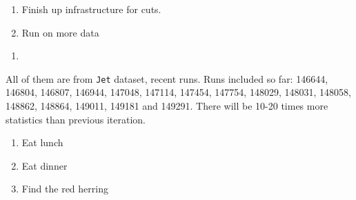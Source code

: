 

\begin{enumerate}
\item Finish up infrastructure for cuts.
\item Run on more data
\end{enumerate}


\begin{enumerate}
\item
\end{enumerate}


All of them are from \texttt{Jet} dataset, recent runs.  Runs included so far:
146644, 146804, 146807, 146944, 147048, 147114, 147454, 147754, 148029, 148031, 148058, 148862, 148864,
149011, 149181 and 149291.  There will be 10-20 times more statistics than previous iteration.




\begin{enumerate}
\item Eat lunch
\item Eat dinner
\item Find the red herring
\end{enumerate}


